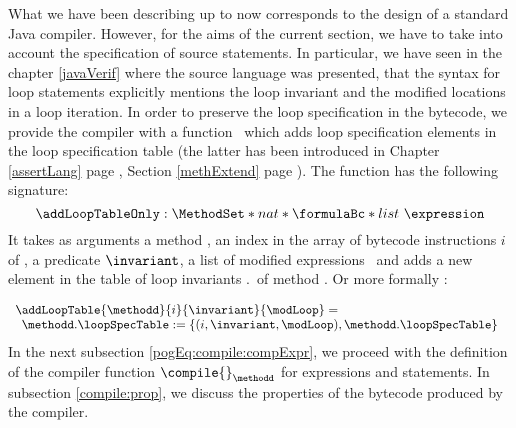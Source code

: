  What we have been describing up to now  corresponds to the design of a standard Java compiler. However, for the aims of the current section, we
 have to take into account the specification of source statements. In particular, we have seen in the chapter \ref{javaVerif}  where the 
 source language was presented,  that the syntax for loop statements explicitly
 mentions the loop invariant and the modified locations in a loop iteration. In order to preserve the loop specification in the bytecode, we provide the compiler with a function 
 \addLoopTableOnly \ which adds  loop specification elements in the loop specification table (the latter has been introduced in
 Chapter \ref{assertLang} page \pageref{assertLang}, Section \ref{methExtend} page \pageref{methExtend}). The function has the following signature:
 $$ \addLoopTableOnly : \MethodSet  *  nat *  \formulaBc  *  list \ \expression $$
 It  takes as arguments a method \methodd, an index in the array of bytecode instructions $i$ of \methodd, 
 a predicate $\invariant$, a list of modified expressions \modLoop \ 
 and adds a new element in the table of loop invariants 
 \methodd.\loopSpecTable \ of method \methodd.
 Or more formally :
 
 $$ \begin{array}{l}
  \addLoopTable{\methodd}{ i }{ \invariant  }{ \modLoop} =  \\
   
   \begin{array}{l}
         
         \methodd.\loopSpecTable := \{ (i,\invariant , \modLoop  ) , \methodd.\loopSpecTable \}

   \end{array}
   \end{array}$$
 In  the next subsection \ref{pogEq:compile:compExpr},  we proceed with the definition of the compiler function $\compile{ }_{\methodd} $ for expressions and statements. 
 In subsection \ref{compile:prop}, we discuss the properties of the bytecode produced by the compiler.




%


